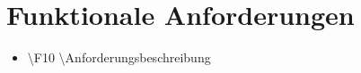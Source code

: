 \section{Funktionale Anforderungen}

\begin{itemize}
\item \textbackslash F10 \textbackslash Anforderungsbeschreibung
\end{itemize}